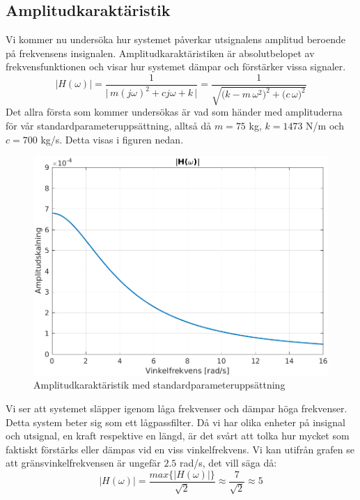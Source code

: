 \subsection{Amplitudkaraktäristik}
Vi kommer nu undersöka hur systemet påverkar utsignalens amplitud beroende på frekvensens insignalen. Amplitudkaraktäristiken är absolutbelopet av frekvensfunktionen och visar hur systemet dämpar och förstärker vissa signaler. 
$$\big|H(\omega)\big|=\dfrac{1}{\Big|\,m(j\omega)^2+cj\omega+k\,\Big|}=\dfrac{1}{\sqrt{\big(k-m\,\omega^2\big)^2+\big(c\,\omega\big)^2}}$$
Det allra första som kommer undersökas är vad som händer med amplituderna för vår standardparameteruppsättning, alltså då $m=75$ kg, $k=1473$ N/m och $c=700$ kg/s. Detta visas i figuren nedan.
\begin{figure}[H]
    \centering
    \includegraphics[scale=0.9]{bilder/amplitudkaraktaristik}
    \caption{Amplitudkaraktäristik med standardparameteruppsättning}
    \label{fig:amplitudkaraktaristik}
\end{figure}
Vi ser att systemet släpper igenom låga frekvenser och dämpar höga frekvenser. Detta system beter sig som ett lågpassfilter.
Då vi har olika enheter på insignal och utsignal, en kraft respektive en längd, är det svårt att tolka hur mycket som faktiskt förstärks eller dämpas vid en viss vinkelfrekvens. Vi kan utifrån grafen se att gränsvinkelfrekvensen är ungefär $2.5$ rad/s, det vill säga då:
$$\big|H(\omega)\big|=\dfrac{max\Big\{\big|H(\omega)\big|\Big\}}{\sqrt{2}}\approx \frac{7}{\sqrt{2}} \approx 5$$
\newpage
